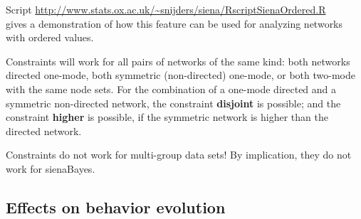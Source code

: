\documentclass[a4paper,fleqn,11pt]{article}
\newcommand{\+}{\, + \,}
\begin{document}
Script \url{http://www.stats.ox.ac.uk/~snijders/siena/RscriptSienaOrdered.R}\\
gives a demonstration of how this feature can be used for analyzing networks
with ordered values.
\medskip

Constraints will work for all pairs of networks of the same kind:
both networks directed one-mode, both symmetric (non-directed) one-mode,
or both two-mode with the same node sets.
For the combination of a one-mode directed and a symmetric non-directed
network, the constraint \textbf{disjoint} is possible;
and the constraint \textbf{higher} is possible,
if the symmetric network is higher than the directed network.

Constraints do not work for multi-group data sets! By implication,
they do not work for \textsf{sienaBayes}.


\subsection{Effects on behavior evolution}
\label{S_eff_beh}
\end{document}
